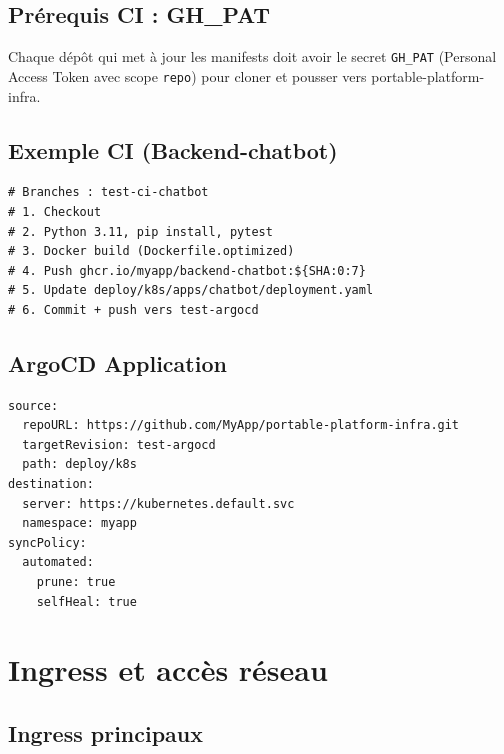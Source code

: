 \documentclass[11pt,a4paper]{article}
\begin{document}
\subsection{Prérequis CI : GH\_PAT}

Chaque dépôt qui met à jour les manifests doit avoir le secret \texttt{GH\_PAT} (Personal Access Token avec scope \texttt{repo}) pour cloner et pousser vers portable-platform-infra.

\subsection{Exemple CI (Backend-chatbot)}

\begin{lstlisting}
# Branches : test-ci-chatbot
# 1. Checkout
# 2. Python 3.11, pip install, pytest
# 3. Docker build (Dockerfile.optimized)
# 4. Push ghcr.io/myapp/backend-chatbot:${SHA:0:7}
# 5. Update deploy/k8s/apps/chatbot/deployment.yaml
# 6. Commit + push vers test-argocd
\end{lstlisting}

\subsection{ArgoCD Application}

\begin{lstlisting}
source:
  repoURL: https://github.com/MyApp/portable-platform-infra.git
  targetRevision: test-argocd
  path: deploy/k8s
destination:
  server: https://kubernetes.default.svc
  namespace: myapp
syncPolicy:
  automated:
    prune: true
    selfHeal: true
\end{lstlisting}

\section{Ingress et accès réseau}

\subsection{Ingress principaux}
\end{document}
